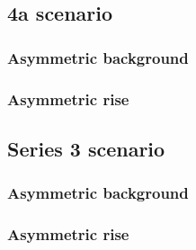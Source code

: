 \documentclass[11pt,a4paper,oneside]{article}
\begin{document}
\newpage
\subsection{4a scenario}
\subsubsection{Asymmetric background}
\subsubsection{Asymmetric rise}

\newpage
\subsection{Series 3 scenario}
\subsubsection{Asymmetric background}
\subsubsection{Asymmetric rise}
\end{document}
